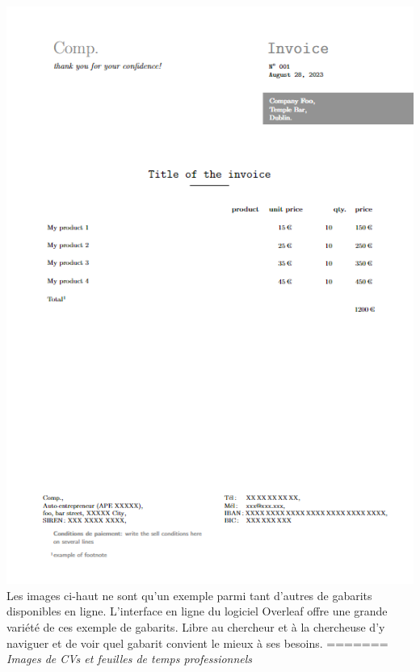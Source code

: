 \documentclass[
  letterpaper,
]{scrbook}
\begin{document}
{{{\protect\includegraphics{images/TStemp.png} Les images ci-haut ne sont
qu'un exemple parmi tant d'autres de gabarits disponibles en ligne.
L'interface en ligne du logiciel Overleaf offre une grande variété de
ces exemple de gabarits. Libre au chercheur et à la chercheuse d'y
naviguer et de voir quel gabarit convient le mieux à ses besoins.
======= \emph{Images de CVs et feuilles de temps professionnels}
}}}
\end{document}
